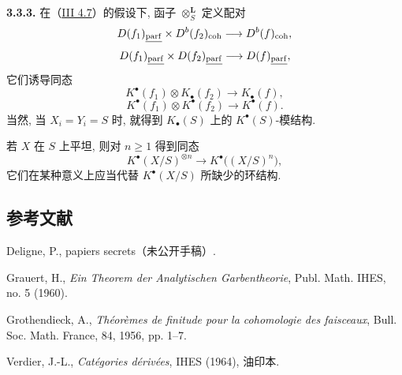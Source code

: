 \textbf{3.3.3.} 在（\hyperlink{sga6.e03.prop.4-7}{III 4.7}）的假设下, 函子 \(\otimes_S^{\mathbf L}\) 定义配对
\[
 D(f_1)_{\underline{\operatorname{parf}}}\times D^b(f_2)_{\operatorname{coh}}\longrightarrow D^b(f)_{\operatorname{coh}},
\]
\[
 D(f_1)_{\underline{\operatorname{parf}}}\times D(f_2)_{\underline{\operatorname{parf}}}\longrightarrow D(f)_{\underline{\operatorname{parf}}},
\]
它们诱导同态
\[
 K^{\bullet}(f_1)\otimes K_{\bullet}(f_2)\longrightarrow K_{\bullet}(f),
\]
\[
 K^{\bullet}(f_1)\otimes K^{\bullet}(f_2)\longrightarrow K^{\bullet}(f).
\]
当然, 当 \(X_i=Y_i=S\) 时, 就得到 \(K_{\bullet}(S)\) 上的 \(K^{\bullet}(S)\)-模结构.

若 \(X\) 在 \(S\) 上平坦, 则对 \(n\geq1\) 得到同态
\[
 K^{\bullet}(X/S)^{\otimes n}\longrightarrow K^{\bullet}\bigl((X/S)^n\bigr),
\]
它们在某种意义上应当代替 \(K^{\bullet}(X/S)\) 所缺少的环结构.

\subsection*{参考文献}
\begin{enumerate}[label={[\arabic*]}]
\item Deligne, P., papiers secrets（未公开手稿）.
\item Grauert, H., \emph{Ein Theorem der Analytischen Garbentheorie}, Publ. Math. IHES, no. 5 (1960).
\item Grothendieck, A., \emph{Théorèmes de finitude pour la cohomologie des faisceaux}, Bull. Soc. Math. France, 84, 1956, pp. 1--7.
\item[{[V]}] Verdier, J.-L., \emph{Catégories dérivées}, IHES (1964), 油印本.
\end{enumerate}



\providecommand{\Chat}{\widehat C}
\providecommand{\Ghat}{\widehat G}
\providecommand{\Gg}{\widehat G_g}
\providecommand{\Ga}{\widehat G_a}
\providecommand{\Grhat}{\widehat{\operatorname{Gr}}}
\providecommand{\Abfil}{\mathrm{Ab\,fil}}
\providecommand{\Kalgfil}{K\text{-}\mathrm{Alg.fil.}}
\providecommand{\Hom}{\operatorname{Hom}}
\providecommand{\Sym}{\mathfrak S}
\providecommand{\id}{\operatorname{Id}}
\providecommand{\Log}{\operatorname{Log}}
\providecommand{\Toddc}{\operatorname{Todd}}
\providecommand{\Ob}{\operatorname{Ob}}
\providecommand{\cG}{\mathcal G}
\providecommand{\cCzero}{\mathcal C_0}
\providecommand{\Fil}{\operatorname{Fil}}


